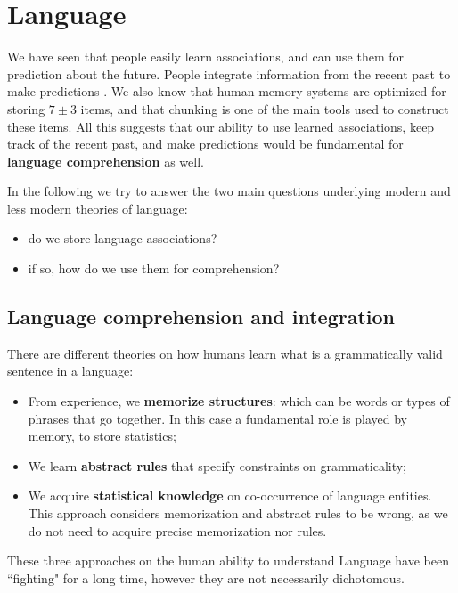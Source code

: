 \chapter{Language}
\label{chap:language}

We have seen that people easily learn associations, and can use them for prediction about the future. People integrate information from the recent past to make predictions \notet. We also know that human memory systems are optimized for storing $7 \pm 3$ items, and that chunking is one of the main tools used to construct these items. All this suggests that our ability to use learned associations, keep track of the recent past, and make predictions would be fundamental for \textbf{language comprehension} as well.


In the following we try to answer the two main questions underlying modern and less modern theories of language:
\begin{itemize}
    \item do we store language associations?
    \item if so, how do we use them for comprehension?
\end{itemize}

\section{Language comprehension and integration}
There are different theories on how humans learn what is a grammatically valid sentence in a language:
\begin{itemize}
    \item From experience, we \textbf{memorize structures}: which can be words or types of phrases that go together. In this case a fundamental role is played by memory, to store statistics;
    \item We learn \textbf{abstract rules} that specify constraints on grammaticality;
    \item We acquire \textbf{statistical knowledge} on co-occurrence of language entities. This approach considers memorization and abstract rules to be wrong, as we do not need to acquire precise memorization nor rules.
\end{itemize}
These three approaches on the human ability to understand Language have been ``fighting" for a long time, however they are not necessarily dichotomous.

